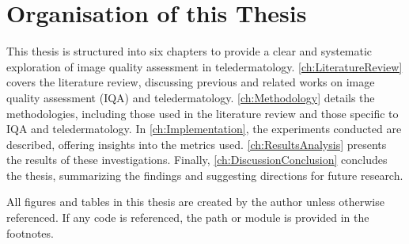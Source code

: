 \section{Organisation of this Thesis}
\label{sec:Structure}
This thesis is structured into six chapters to provide a clear and systematic exploration of image quality assessment in teledermatology. \autoref{ch:LiteratureReview} covers the literature review, discussing previous and related works on image quality assessment (IQA) and teledermatology. \autoref{ch:Methodology} details the methodologies, including those used in the literature review and those specific to IQA and teledermatology. In \autoref{ch:Implementation}, the experiments conducted are described, offering insights into the metrics used. \autoref{ch:ResultsAnalysis} presents the results of these investigations. Finally, \autoref{ch:DiscussionConclusion} concludes the thesis, summarizing the findings and suggesting directions for future research. \par
\vspace{\baselineskip}
\noindent
All figures and tables in this thesis are created by the author unless otherwise referenced. If any code is referenced, the path or module is provided in the footnotes. \par